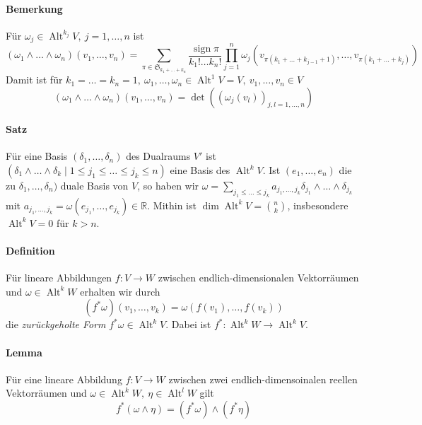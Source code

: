 \documentclass[12pt,a4paper,fleqn]{article}
\def\R{{\mathbb{R}}}
\begin{document}
\paragraph{Bemerkung} Für $\omega_j \in \operatorname{Alt}^{k_j} V,\ j = 1, \dots, n$ ist
\begin{displaymath}
(\omega_1\wedge \dots\wedge \omega_n)(v_1, \dots, v_n) = \sum_{\pi \in \mathfrak{S}_{k_1+\dots +k_n}} \frac{\operatorname{sign}\pi}{k_1!\dots k_n!} \prod_{j=1}^n \omega_j (v_{ \pi(k_1+\dots +k_{j-1}+1)}, \dots, v_{\pi(k_1+\dots+k_j)})
\end{displaymath}
Damit ist für $k_1 = \dots = k_n = 1,\ \omega_1, \dots, \omega_n \in \operatorname{Alt}^1 V = V,\ v_1, \dots, v_n \in V$
\begin{displaymath}
(\omega_1\wedge\dots\wedge\omega_n)(v_1, \dots, v_n) = \det ((\omega_j(v_l))_{j, l = 1, \dots, n})
\end{displaymath}

\paragraph{Satz} Für eine Basis $(\delta_1, \dots, \delta_n)$ des Dualraums $V'$ ist ${(\delta_1\wedge\dots\wedge\delta_k \mid 1\leq j_1\leq\dots\leq j_k \leq n)}$ eine Basis des $\operatorname{Alt}^k V$. 
Ist $(e_1, \dots, e_n)$ die zu $\delta_1, \dots, \delta_n)$ duale Basis von $V$, so haben wir $\omega = \sum_{j_1\leq \dots\leq j_k} a_{j_1, \dots, j_k} \delta_{j_1}\wedge\dots\wedge\delta_{j_k}$ mit $a_{j_1, \dots, j_k} = \omega(e_{j_1}, \dots, e_{j_k})\in \R$. 
Mithin ist $\dim\operatorname{Alt}^k V = \binom{n}{k}$, insbesondere $\operatorname{Alt}^k V = 0$ für $k > n$.

\paragraph{Definition} Für lineare Abbildungen $f\colon V \rightarrow W$ zwischen endlich-dimensionalen Vektorräumen und $\omega \in \operatorname{Alt}^k W$ erhalten wir durch 
\begin{displaymath}
(f^\ast\omega)(v_1, \dots, v_k) = \omega(f(v_1), \dots, f(v_k))
\end{displaymath}
die \textit{zurückgeholte Form} $f^\ast\omega \in \operatorname{Alt}^k V$. Dabei ist $f^\ast\colon \operatorname{Alt}^k W \rightarrow \operatorname{Alt}^k V$.

\paragraph{Lemma} Für eine lineare Abbildung $f\colon V \rightarrow W$ zwischen zwei endlich-dimensoinalen reellen Vektorräumen und $\omega\in \operatorname{Alt}^k W,\ \eta \in \operatorname{Alt}^l W$ gilt
\begin{displaymath}
f^\ast(\omega\wedge\eta) = (f^\ast\omega)\wedge(f^\ast\eta)
\end{displaymath}
\end{document}
